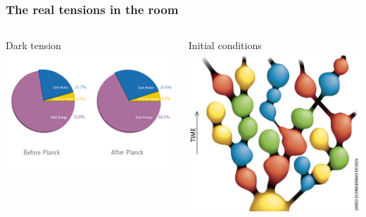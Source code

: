 \documentclass[aspectratio=169, handout]{beamer}
\begin{document}
\begin{frame}
    \frametitle{The real tensions in the room}


    \begin{columns}
        \begin{block}{Dark tension}
            \includegraphics[width=\textwidth]{figures/pie_chart.jpg}
        \end{block}
        \begin{block}{Initial conditions}
            \includegraphics[width=\textwidth]{figures/multiverse.jpg}

\end{block}
\end{columns}
\end{frame}
\end{document}

